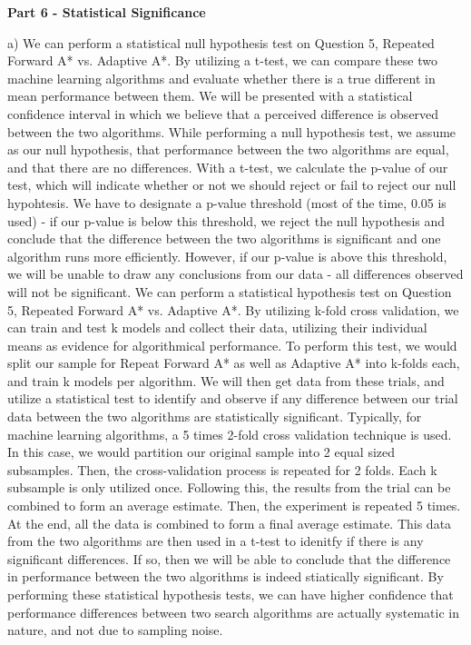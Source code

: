 \documentclass[11pt]{article}
\begin{document}
    \begin{center}
        \Large
        \textbf{Part 6 - Statistical Significance}
    \end{center}
    \normalsize
    a) 
    We can perform a statistical null hypothesis test on Question 5, Repeated Forward A* vs. Adaptive A*. By utilizing a t-test, we can compare these two machine learning algorithms and evaluate whether there is a true different in mean performance between them. We will be presented with a statistical confidence interval in which we believe that a perceived difference is observed between the two algorithms. While performing a null hypothesis test, we assume as our null hypothesis, that performance between the two algorithms are equal, and that there are no differences. With a t-test, we calculate the p-value of our test, which will indicate whether or not we should reject or fail to reject our null hypohtesis. We have to designate a p-value threshold (most of the time, 0.05 is used) - if our p-value is below this threshold, we reject the null hypothesis and conclude that the difference between the two algorithms is significant and one algorithm runs more efficiently. However, if our p-value is above this threshold, we will be unable to draw any conclusions from our data - all differences observed will not be significant. 
    We can perform a statistical hypothesis test on Question 5, Repeated Forward A* vs. Adaptive A*. By utilizing k-fold cross validation, we can train and test k models and collect their data, utilizing their individual means as evidence for algorithmical performance. To perform this test, we would split our sample for Repeat Forward A* as well as Adaptive A* into k-folds each, and train k models per algorithm. We will then get data from these trials, and utilize a statistical test to identify and observe if any difference between our trial data between the two algorithms are statistically significant. Typically, for machine learning algorithms, a 5 times 2-fold cross validation technique is used. In this case, we would partition our original sample into 2 equal sized subsamples. Then, the cross-validation process is repeated for 2 folds. Each k subsample is only utilized once. Following this, the results from the trial can be combined to form an average estimate. Then, the experiment is repeated 5 times. At the end, all the data is combined to form a final average estimate. This data from the two algorithms are then used in a t-test to idenitfy if there is any significant differences. If so, then we will be able to conclude that the difference in performance between the two algorithms is indeed stiatically significant. By performing these statistical hypothesis tests, we can have higher confidence that performance differences between two search algorithms are actually systematic in nature, and not due to sampling noise.
    
    
\end{document}
